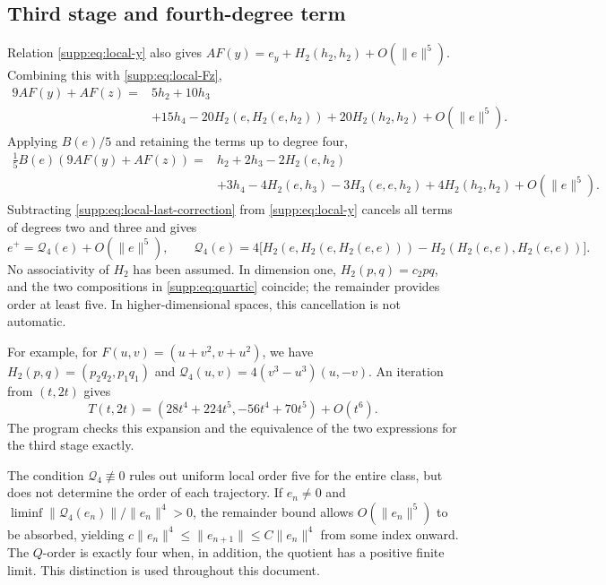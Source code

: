 \documentclass[11pt,a4paper]{article}
\numberwithin{equation}{section}
\numberwithin{table}{section}
\theoremstyle{plain}
\theoremstyle{definition}\newtheorem{definition}[theorem]{Definition}
\theoremstyle{remark}\newtheorem{remark}[theorem]{Remark}
\begin{document}
\subsection{Third stage and fourth-degree term}
Relation \eqref{supp:eq:local-y} also gives
$AF(y)=e_y+H_2(h_2,h_2)+O(\|e\|^5)$. Combining this with
\eqref{supp:eq:local-Fz},
\begin{equation}
 \begin{aligned}
 9AF(y)+AF(z)={}&5h_2+10h_3\\
 &+15h_4-20H_2(e,H_2(e,h_2))+20H_2(h_2,h_2)+O(\|e\|^5).
 \end{aligned}\label{supp:eq:local-combination}
\end{equation}
Applying $B(e)/5$ and retaining the terms up to degree four,
\begin{equation}
 \begin{aligned}
 \tfrac15B(e)(9AF(y)+AF(z))={}&h_2+2h_3-2H_2(e,h_2)\\
 &+3h_4-4H_2(e,h_3)-3H_3(e,e,h_2)+4H_2(h_2,h_2)
 +O(\|e\|^5).
 \end{aligned}\label{supp:eq:local-last-correction}
\end{equation}
Subtracting \eqref{supp:eq:local-last-correction} from
\eqref{supp:eq:local-y} cancels all terms of degrees two and three
and gives
\begin{equation}
 e^+=\mathcal Q_4(e)+O(\|e\|^5),\qquad
 \mathcal Q_4(e)=4\bigl[H_2(e,H_2(e,H_2(e,e)))-H_2(H_2(e,e),H_2(e,e))\bigr].
 \label{supp:eq:quartic}
\end{equation}
No associativity of $H_2$ has been assumed. In dimension one,
$H_2(p,q)=c_2pq$, and the two compositions in \eqref{supp:eq:quartic}
coincide; the remainder provides order at least five. In
higher-dimensional spaces, this cancellation is not automatic.

For example, for $F(u,v)=(u+v^2,v+u^2)$, we have
$H_2(p,q)=(p_2q_2,p_1q_1)$ and
$\mathcal Q_4(u,v)=4(v^3-u^3)(u,-v)$. An iteration from $(t,2t)$ gives
\begin{equation}
 T(t,2t)=(28t^4+224t^5,-56t^4+70t^5)+O(t^6).
 \label{supp:eq:path-expansion}
\end{equation}
The program  checks this expansion
and the equivalence of the two expressions for the third stage exactly.

The condition $\mathcal Q_4\not\equiv0$ rules out uniform local order
five for the entire class, but does not determine the order of each
trajectory. If $e_n\neq0$ and
$\liminf\|\mathcal Q_4(e_n)\|/\|e_n\|^4>0$, the remainder bound allows
$O(\|e_n\|^5)$ to be absorbed, yielding
$c\|e_n\|^4\leq\|e_{n+1}\|\leq C\|e_n\|^4$ from some index onward.
The $Q$-order is exactly four when, in addition, the quotient has a
positive finite limit. This distinction is used throughout this document.
\end{document}
